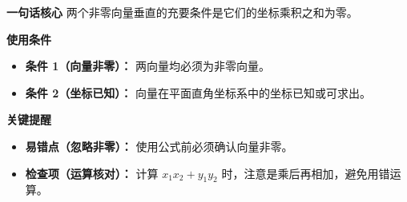 \begin{summarybox}
	\textbf{\textcolor{CSummary}{一句话核心}}
	两个非零向量垂直的充要条件是它们的坐标乘积之和为零。

	\medskip
	\textbf{\textcolor{CSummary}{使用条件}}
	\begin{itemize}[leftmargin=*, itemsep=0.5em, topsep=0.4em]
		\item \textbf{条件 1（向量非零）：} 两向量均必须为非零向量。
		\item \textbf{条件 2（坐标已知）：} 向量在平面直角坐标系中的坐标已知或可求出。
	\end{itemize}

	\medskip
	\textbf{\textcolor{CSummary}{关键提醒}}
	\begin{itemize}[leftmargin=*, itemsep=0.5em, topsep=0.4em]
		\item \textbf{易错点（忽略非零）：} 使用公式前必须确认向量非零。
		\item \textbf{检查项（运算核对）：} 计算 $x_1x_2+y_1y_2$ 时，注意是乘后再相加，避免用错运算。
	\end{itemize}

\end{summarybox}
